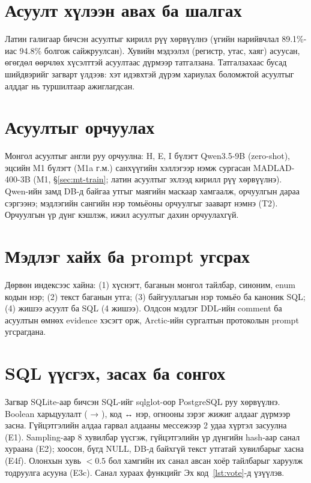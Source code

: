\section{Асуулт хүлээн авах ба шалгах}
\label{sec:sys-intake}

Латин галигаар бичсэн асуултыг кирилл рүү хөрвүүлнэ (үгийн нарийвчлал 89.1\%-иас 94.8\% болгож сайжруулсан). Хувийн
мэдээлэл (регистр, утас, хаяг) асуусан, өгөгдөл өөрчлөх хүсэлттэй асуултаас дүрмээр татгалзана. Татгалзахаас бусад
шийдвэрийг загварт үлдээв: хэт идэвхтэй дүрэм хариулах боломжтой асуултыг алддаг нь туршилтаар ажиглагдсан.

\section{Асуултыг орчуулах}
\label{sec:sys-translate}

Монгол асуултыг англи руу орчуулна: H, E, I бүлэгт Qwen3.5-9B (zero-shot), эцсийн M1 бүлэгт (M1a г.м.) санхүүгийн
хэллэгээр нэмж сургасан MADLAD-400-3B (M1, §\ref{sec:mt-train}; латин асуултыг эхлээд кирилл рүү хөрвүүлнэ). Qwen-ийн замд
DB-д байгаа утгыг \tsql{[V1]} маягийн маскаар хамгаалж, орчуулгын дараа сэргээнэ; мэдлэгийн сангийн нэр томьёоны
орчуулгыг зааварт нэмнэ (T2). Орчуулгын үр дүнг кэшлэж, ижил асуултыг
дахин орчуулахгүй.

\section{Мэдлэг хайх ба prompt угсрах}
\label{sec:sys-rag}

Дөрвөн индексээс хайна: (1) хүснэгт, баганын монгол тайлбар, синоним, enum кодын нэр; (2) текст баганын утга; (3)
байгууллагын нэр томьёо ба каноник SQL; (4) жишээ асуулт ба SQL (4 жишээ). Олдсон мэдлэг DDL-ийн comment ба асуултын өмнөх
evidence хэсэгт орж, Arctic-ийн сургалтын протоколын prompt угсрагдана.

\section{SQL үүсгэх, засах ба сонгох}
\label{sec:sys-generate}

Загвар SQLite-аар бичсэн SQL-ийг sqlglot-оор PostgreSQL руу хөрвүүлнэ. Boolean харьцуулалт ( → ),
код ↔ нэр, огнооны  зэрэг жижиг алдааг дүрмээр засна. Гүйцэтгэлийн алдаа гарвал алдааны мессежээр 2 удаа хүртэл
засуулна (E1). Sampling-аар 8 хувилбар үүсгэж, гүйцэтгэлийн үр дүнгийн hash-аар санал хураана (E2); хоосон, бүгд NULL,
DB-д байхгүй текст утгатай хувилбарыг хасна (E4f). Олонхын хувь $< 0.5$ бол хамгийн их санал авсан хоёр тайлбарыг
харуулж тодруулга асууна (E3c). Санал хураах функцийг Эх код~\ref{lst:vote}-д үзүүлэв.

